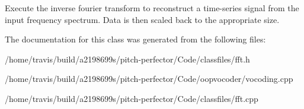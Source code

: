 Execute the inverse fourier transform to reconstruct a time-\/series signal from the input frequency spectrum. Data is then scaled back to the appropriate size. 

The documentation for this class was generated from the following files\-:\begin{DoxyCompactItemize}
\item 
/home/travis/build/a2198699s/pitch-\/perfector/\-Code/classfiles/fft.\-h\item 
/home/travis/build/a2198699s/pitch-\/perfector/\-Code/oopvocoder/vocoding.\-cpp\item 
/home/travis/build/a2198699s/pitch-\/perfector/\-Code/classfiles/fft.\-cpp\end{DoxyCompactItemize}
